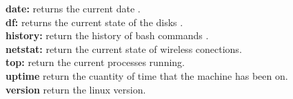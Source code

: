 \documentclass[10pt,a4paper]{article} %
\begin{document}
    \textbf{date:} returns the current date .
    \\
    \textbf{df:} returns the current state of the disks .
    \\
    \textbf{history:} return the history of bash commands .
    \\
    \textbf{netstat:} return the current state of wireless conections.
    \\
    \textbf{top:} return the current processes running.
    \\
    \textbf{uptime}  return the cuantity of time that the machine has been on.
    \\
    \textbf{version} return the linux version.



















    \nocite{*}
    
    
\end{document}
